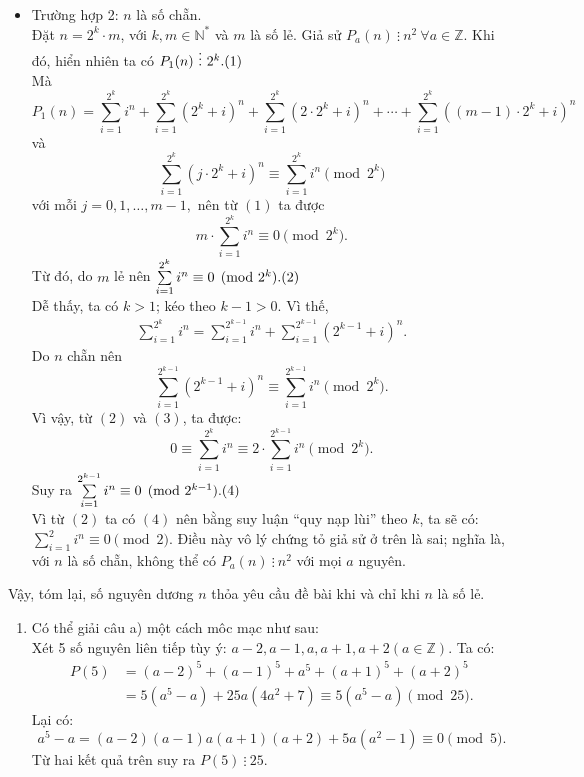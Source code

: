 \begin{bt}
{\begin{enumerate}[a)]
\begin{itemize}
\item Trường hợp 2: $n$ là số chẵn.\\
Đặt $n=2^k\cdot m$, với $k, m \in\mathbb{N^*}$ và $m$ là số lẻ. Giả sử $P_a(n) \ \vdots \ n^2 \ \forall a\in\mathbb{Z}.$ Khi đó, hiển nhiên ta có $P_1(n) \ \vdots \ 2^k. \hfill (1)$\\  Mà
$$ P_1(n)=\sum\limits_{i=1}^{2^k}i^n + \sum\limits_{i=1}^{2^k}(2^k+i)^n + \sum\limits_{i=1}^{2^k}(2\cdot 2^k+i)^n+\dotsb +\sum\limits_{i=1}^{2^k}\left((m-1)\cdot 2^k+i\right)^n $$ và 
$$\sum\limits_{i=1}^{2^k}(j\cdot 2^k+i)^n \equiv \sum\limits_{i=1}^{2^k}i^n \pmod{2^k}  $$ với mỗi $j=0,1, \dotsc, m-1,$ nên từ $(1)$ ta được 
$$ m\cdot \sum\limits_{i=1}^{2^k}i^n \equiv 0 \pmod{2^k}. $$ 
Từ đó, do $m$ lẻ nên  $  \sum\limits_{i=1}^{2^k}i^n \equiv 0 \pmod{2^k}. \hfill (2)$\\
Dễ thấy, ta có $k>1$; kéo theo $k-1>0.$ Vì thế,
	\begin{align*}
	\sum\limits_{i=1}^{2^k}i^n=\sum\limits_{i=1}^{2^{k-1}}i^n+\sum\limits_{i=1}^{2^{k-1}}(2^{k-1}+i)^n. \tag{3}
	\end{align*}
Do $n$ chẵn nên 
$$\sum\limits_{i=1}^{2^{k-1}}(2^{k-1}+i)^n \equiv \sum\limits_{i=1}^{2^{k-1}}i^n \pmod{2^k}. $$
Vì vậy, từ $(2)$ và $(3)$, ta được:
	$$0\equiv \sum\limits_{i=1}^{2^k}i^n \equiv 2\cdot \sum\limits_{i=1}^{2^{k-1}}i^n \pmod{2^k}. $$ Suy ra $ \sum\limits_{i=1}^{2^{k-1}}i^n \equiv 0 \pmod{2^{k-1}}. \hfill (4)$\\
Vì từ $(2)$ ta có $(4)$ nên bằng suy luận ``quy nạp lùi'' theo $k$, ta sẽ có: $\sum\limits_{i=1}^2 i^n\equiv 0\pmod{2}.$ Điều này vô lý chứng tỏ giả sử ở trên là sai; nghĩa là, với $n$ là số chẵn, không thể có $P_a(n) \ \vdots \ n^2$ với mọi $a$ nguyên.
\end{itemize}
\end{enumerate}
Vậy, tóm lại, số nguyên dương $n$ thỏa yêu cầu đề bài khi và chỉ khi $n$ là số lẻ.
\begin{nx}\hfill
\begin{enumerate}[1.]
\item Có thể giải câu a) một cách môc mạc như sau:\\
Xét 5 số nguyên liên tiếp tùy ý: $a-2,a-1,a,a+1,a+2 (a\in\mathbb{Z}).$ Ta có:
\begin{align*}
P(5)&=(a-2)^5+(a-1)^5+a^5+(a+1)^5+(a+2)^5\\ 
& =5(a^5-a)+25a(4a^2+7) \equiv 5(a^5-a) \pmod{25}.
\end{align*}
Lại có:
	$$ a^5-a =(a-2)(a-1)a(a+1)(a+2) +5a(a^2-1)\equiv 0\pmod 5.$$ Từ hai kết quả trên suy ra $P(5) \ \vdots \ 25.$\\

\end{enumerate}
\end{nx}}
\end{bt}

